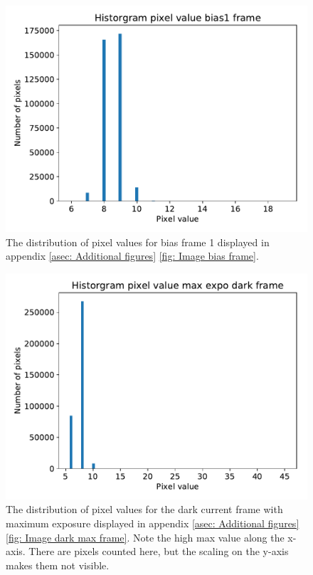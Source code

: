 \documentclass{emulateapj}
\begin{document}
\begin{figure}
	\centering
	\includegraphics[width=\linewidth]{./pythonscripts/hist_pixel_bias1.pdf}
	\caption[Distribution pixels bias 1]{The distribution of pixel values for bias frame 1 displayed in appendix \ref{asec: Additional figures} \cref{fig: Image bias frame}.}
	\label{fig: Histogram bias}
\end{figure}

\begin{figure}
	\centering
	\includegraphics[width=\linewidth]{./pythonscripts/hist_pixel_darkmax.pdf}
	\caption[Distribution pixels dark current max exposure]{The distribution of pixel values for the dark current frame with maximum exposure displayed in appendix \ref{asec: Additional figures} \cref{fig: Image dark max frame}. Note the high max value along the x-axis. There are pixels counted here, but the scaling on the y-axis makes them not visible.}
		\label{fig: Histogram dark max}
\end{figure}
\end{document}
